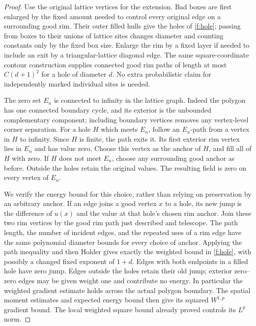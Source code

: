 \begin{proof}
Use the original lattice vertices for the extension. Bad boxes are
first enlarged by the fixed amount needed to control every original
edge on a surrounding good rim. Their outer filled hulls give the
holes of \ref{f:hole}; passing from boxes to their unions of lattice
sites changes diameter and counting constants only by the fixed box
size. Enlarge the rim by a fixed layer if needed to include an exit
by a triangular-lattice diagonal edge. The same square-coordinate
contour construction supplies connected good rim paths of length
at most $C(d+1)^2$ for a hole of diameter $d$. No extra probabilistic
claim for independently marked individual sites is needed.

The zero set $E_n$ is connected to infinity in the lattice graph.
Indeed the polygon has one connected boundary cycle, and its
exterior is the unbounded complementary component; including
boundary vertices removes any vertex-level corner separation.
For a hole $H$ which meets $E_n$, follow an $E_n$-path from a
vertex in $H$ to infinity. Since $H$ is finite, the path exits it.
Its first exterior rim vertex lies in $E_n$ and has value zero.
Choose this vertex as the anchor of $H$, and fill all of $H$
with zero. If $H$ does not meet $E_n$, choose any surrounding good
anchor as before. Outside the holes retain the original values.
The resulting field is zero on every vertex of $E_n$.

We verify the energy bound for this choice, rather than relying
on preservation by an arbitrary anchor. If an edge joins a good
vertex $x$ to a hole, its new jump is the difference of $u(x)$
and the value at that hole's chosen rim anchor. Join these two
rim vertices by the good rim path just described and telescope.
The path length, the number of incident edges, and the repeated
uses of a rim edge have the same polynomial diameter bounds for
every choice of anchor. Applying the path inequality and then
Holder gives exactly the weighted bound in \ref{f:hole}, with
possibly a changed fixed exponent of $1+d$. Edges with both
endpoints in a filled hole have zero jump. Edges outside the
holes retain their old jump; exterior zero--zero edges may be
given weight one and contribute no energy. In particular the
weighted gradient estimate holds across the actual polygon
boundary. The spatial moment estimates and expected energy
bound then give its squared $W^{1,p}$ gradient bound. The local
weighted square bound already proved controls its $L^p$ norm.


\end{proof}
